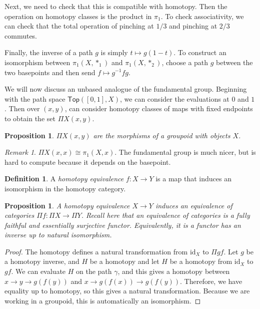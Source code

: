 \documentclass[leqno, openany]{memoir}
\newtheorem{prop}[thm]{Proposition}
\theoremstyle{definition}
\newtheorem{defn}[thm]{Definition}
\theoremstyle{remark}
\newtheorem{rmk}[thm]{Remark}
\theoremstyle{plain}
\theoremstyle{definition}
\theoremstyle{remark}
\newcommand{\mr}[1]{\mathrm{#1}}
\begin{document}
Next, we need to check that this is compatible with homotopy. Then the
operation on homotopy classes is the product in $\pi_1$. To check
associativity, we can check that the total operation of pinching at $1/3$ and
pinching at $2/3$ commutes.

Finally, the inverse of a path $g$ is simply $t \mapsto g(1-t)$. To construct
an isomorphism between $\pi_1(X,*_1)$ and $\pi_1(X, *_2)$, choose a path $g$
between the two basepoints and then send $f \mapsto g^{-1} f g$.

We will now discuss an unbased analogue of the fundamental group. Beginning
with the path space $\mathsf{Top}([0,1],X)$, we can consider the evaluations at
$0$ and $1$. Then over $(x,y)$, can consider homotopy classes of maps with
fixed endpoints to obtain the set $\Pi X(x,y)$.

\begin{prop} $\Pi X(x,y)$ are the morphisms of a \textit{groupoid} with objects
$X$.  \end{prop}

\begin{rmk} $\Pi X(x,x) \cong \pi_1(X,x)$. The fundamental group is much nicer,
but is hard to compute because it depends on the basepoint.  \end{rmk}

\begin{defn} A \textit{homotopy equivalence} $f:X \to Y$ is a map that induces
an isomorphism in the homotopy category.  \end{defn}

\begin{prop} A homotopy equivalence $X \to Y$ induces an equivalence of
    categories $\Pi f: \Pi X \to \Pi Y$. Recall here that an equivalence of
    categories is a fully faithful and essentially surjective functor.
    Equivalently, it is a functor has an inverse up to natural isomorphism.
\end{prop}

\begin{proof} The homotopy defines a natural transformation from $\mr{id}_X$ to
    $\Pi gf$. Let $g$ be a homotopy inverse, and $H$ be a homotopy and let $H$
    be a homotopy from $\mr{id}_X$ to $gf$. We can evaluate $H$ on the path
    $\gamma$, and this gives a homotopy between $x \to y \to g(f(y))$ and $x
    \to g(f(x)) \to g(f(y))$. Therefore, we have equality up to homotopy, so
    this gives a natural transformation. Because we are working in a groupoid,
    this is automatically an isomorphism.  \end{proof}
\end{document}
